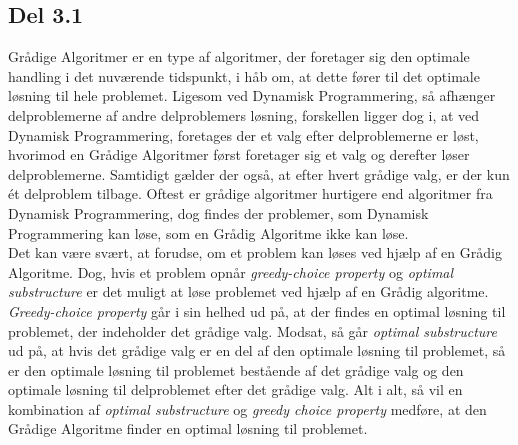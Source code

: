\documentclass{report}
\begin{document}
\subsection*{Del 3.1}
Grådige Algoritmer er en type af algoritmer, der foretager sig den optimale handling i det nuværende tidspunkt, i håb om, at dette fører til det optimale løsning til hele problemet. Ligesom ved Dynamisk Programmering, så afhænger delproblemerne af andre delproblemers løsning, forskellen ligger dog i, at ved Dynamisk Programmering, foretages der et valg efter delproblemerne er løst, hvorimod en Grådige Algoritmer først foretager sig et valg og derefter løser delproblemerne. Samtidigt gælder der også, at efter hvert grådige valg, er der kun ét delproblem tilbage. Oftest er grådige algoritmer hurtigere end algoritmer fra Dynamisk Programmering, dog findes der problemer, som Dynamisk Programmering kan løse, som en Grådig Algoritme ikke kan løse. \\ 
Det kan være svært, at forudse, om et problem kan løses ved hjælp af en Grådig Algoritme. Dog, hvis et problem opnår \textit{greedy-choice property} og \textit{optimal substructure} er det muligt at løse problemet ved hjælp af en Grådig algoritme. \\
\textit{Greedy-choice property} går i sin helhed ud på, at der findes en optimal løsning til problemet, der indeholder det grådige valg. Modsat, så går \textit{optimal substructure} ud på, at hvis det grådige valg er en del af den optimale løsning til problemet, så er den optimale løsning til problemet bestående af det grådige valg og den optimale løsning til delproblemet efter det grådige valg. Alt i alt, så vil en kombination af \textit{optimal substructure} og \textit{greedy choice property} medføre, at den Grådige Algoritme finder en optimal løsning til problemet.

\newpage 
\end{document}
